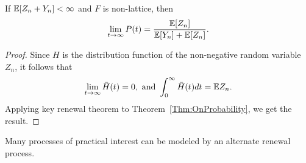 \documentclass[a4paper,10pt,english]{article}
\begin{document}
\begin{cor}
\label{cor:LimitingOnProbability}
If $\mathbb{E}[Z_n+Y_n]< \infty $ and $F$ is non-lattice, then 
\begin{equation*}
\lim_{t \to \infty}P(t)=\frac{\mathbb{E}[Z_n]}{\mathbb{E}[Y_n]+\mathbb{E}[Z_n]}.
\end{equation*}
\end{cor}
\begin{proof} Since $H$ is the distribution function of the non-negative random variable $Z_n$, it follows that 
\begin{align*}
\lim_{t \to \infty}\bar{H}(t) = 0, \text{ and } \int_0^\infty \bar{H}(t)dt = \mathbb{E} Z_n.
\end{align*}
Applying key renewal theorem to Theorem~\ref{Thm:OnProbability}, we get the result.
\end{proof}

Many processes of practical interest can be modeled by an alternate renewal process. 
\end{document}

